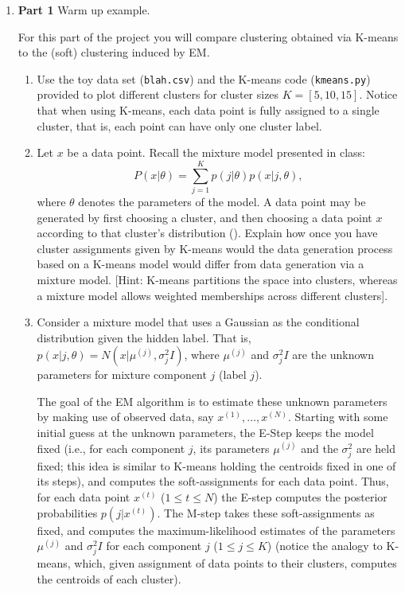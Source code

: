 \begin{enumerate}

\item {\bf Part 1} Warm up example.

For this part of the project you will compare clustering obtained via K-means to the (soft) clustering induced by EM.

\begin{enumerate}
  \item Use the toy data set (\texttt{blah.csv}) and the K-means code (\texttt{kmeans.py}) provided to plot different clusters for cluster sizes $K = [5, 10, 15]$. Notice that when using K-means, each data point is fully assigned to a single cluster, that is, each point can have only one cluster label.
  \item Let $x$ be a data point. Recall the mixture model presented in class: $$P(x | \theta) = \sum^{K}_{j=1} p(j| \theta)p(x | j, \theta),$$ where $\theta$ denotes the parameters of the model. A data point may be generated by first choosing a cluster, and then choosing a data point $x$ according to that cluster's distribution (). Explain how once you have cluster assignments given by K-means would the data generation process based on a K-means model would differ from data generation via a mixture model. [Hint: K-means partitions the space into clusters, whereas a mixture model allows weighted memberships across different clusters].
  \item Consider a mixture model that uses a Gaussian as the conditional distribution given the hidden label. That is, $p(x | j, \theta) = N(x | \mu^{(j)}, \sigma^2_{j} I)$, where $\mu^{(j)}$ and $\sigma^2_jI$ are the unknown parameters for mixture component $j$ (label $j$). 

    The goal of the EM algorithm is to estimate these unknown parameters by making use of observed data, say $x^{(1)},\ldots, x^{(N)}$. Starting with some initial guess at the unknown parameters, the E-Step keeps the model fixed (i.e., for each component $j$, its parameters $\mu^{(j)}$ and the $\sigma^2_{j}$ are held fixed; this idea is similar to K-means holding the centroids fixed in one of its steps), and computes the soft-assignments for each data point. Thus, for each data point $x^{(t)}$ ($1 \le t \le N$) the E-step computes the posterior probabilities $p(j | x^{(t)})$. The M-step takes these soft-assignments as fixed, and computes the maximum-likelihood estimates of the parameters $\mu^{(j)}$ and $\sigma_j^2I$ for each component $j$ ($1 \le j \le K$) (notice the analogy to K-means, which, given assignment of data points to their clusters, computes the centroids of each cluster).


\end{enumerate}
\end{enumerate}
